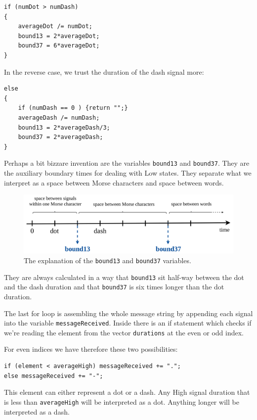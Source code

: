 \documentclass[12pt]{report}
\begin{document}
\begin{lstlisting}
if (numDot > numDash)
{
	averageDot /= numDot;
	bound13 = 2*averageDot;
	bound37 = 6*averageDot;
}
\end{lstlisting}

\newpage

In the reverse case, we trust the duration of the dash signal more:

\begin{lstlisting}
else
{
	if (numDash == 0 ) {return "";}
	averageDash /= numDash;
	bound13 = 2*averageDash/3;
	bound37 = 2*averageDash;
}
\end{lstlisting}

Perhaps a bit bizzare invention are the variables \texttt{bound13} and \texttt{bound37}. They are the auxiliary boundary times for dealing with Low states. They separate what we interpret as a space between Morse characters and space between words.


\begin{figure}[H]
\centering\includegraphics[width=14.5cm]{bound13_37.png}
\caption{The explanation of the \texttt{bound13} and \texttt{bound37} variables.}				
\label{fig:bound}
\end{figure}

They are always calculated in a way that \texttt{bound13} sit half-way between the dot and the dash duration and that \texttt{bound37} is six times longer than the dot duration.

The last for loop is assembling the whole message string by appending each signal into the variable \texttt{messageReceived}. Inside there is an if statement which checks if we're reading the element from the vector \texttt{durations} at the even or odd index.

For even indices we have therefore these two possibilities:

\begin{lstlisting}
if (element < averageHigh) messageReceived += ".";
else messageReceived += "-";
\end{lstlisting}

This element can either represent a dot or a dash. Any High signal duration that is less than \texttt{averageHigh} will be interpreted as a dot. Anything longer will be interpreted as a dash.
\end{document}
